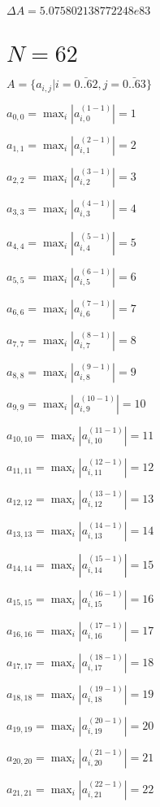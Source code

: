 \documentclass[a4paper,12pt]{article}
\begin{document}
$\Delta A = 5.075802138772248e83$



\section{ $N = 62$ }
$A = \{ a _{ i, j } | i = \bar { 0..62 }, j = \bar { 0..63 } \}$

$a _{ 0, 0 } =  \max _i |a _{ i, 0 } ^{ (1 - 1) } | = 1$

$a _{ 1, 1 } =  \max _i |a _{ i, 1 } ^{ (2 - 1) } | = 2$

$a _{ 2, 2 } =  \max _i |a _{ i, 2 } ^{ (3 - 1) } | = 3$

$a _{ 3, 3 } =  \max _i |a _{ i, 3 } ^{ (4 - 1) } | = 4$

$a _{ 4, 4 } =  \max _i |a _{ i, 4 } ^{ (5 - 1) } | = 5$

$a _{ 5, 5 } =  \max _i |a _{ i, 5 } ^{ (6 - 1) } | = 6$

$a _{ 6, 6 } =  \max _i |a _{ i, 6 } ^{ (7 - 1) } | = 7$

$a _{ 7, 7 } =  \max _i |a _{ i, 7 } ^{ (8 - 1) } | = 8$

$a _{ 8, 8 } =  \max _i |a _{ i, 8 } ^{ (9 - 1) } | = 9$

$a _{ 9, 9 } =  \max _i |a _{ i, 9 } ^{ (10 - 1) } | = 10$

$a _{ 10, 10 } =  \max _i |a _{ i, 10 } ^{ (11 - 1) } | = 11$

$a _{ 11, 11 } =  \max _i |a _{ i, 11 } ^{ (12 - 1) } | = 12$

$a _{ 12, 12 } =  \max _i |a _{ i, 12 } ^{ (13 - 1) } | = 13$

$a _{ 13, 13 } =  \max _i |a _{ i, 13 } ^{ (14 - 1) } | = 14$

$a _{ 14, 14 } =  \max _i |a _{ i, 14 } ^{ (15 - 1) } | = 15$

$a _{ 15, 15 } =  \max _i |a _{ i, 15 } ^{ (16 - 1) } | = 16$

$a _{ 16, 16 } =  \max _i |a _{ i, 16 } ^{ (17 - 1) } | = 17$

$a _{ 17, 17 } =  \max _i |a _{ i, 17 } ^{ (18 - 1) } | = 18$

$a _{ 18, 18 } =  \max _i |a _{ i, 18 } ^{ (19 - 1) } | = 19$

$a _{ 19, 19 } =  \max _i |a _{ i, 19 } ^{ (20 - 1) } | = 20$

$a _{ 20, 20 } =  \max _i |a _{ i, 20 } ^{ (21 - 1) } | = 21$

$a _{ 21, 21 } =  \max _i |a _{ i, 21 } ^{ (22 - 1) } | = 22$
\end{document}
